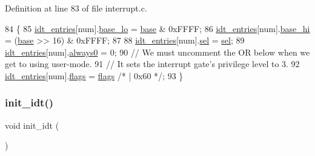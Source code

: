 Definition at line 83 of file interrupt.\+c.


\begin{DoxyCode}
84 \{
85     \hyperlink{a00110_a02c62ffc54da283f5faaa40b125d2dce_a02c62ffc54da283f5faaa40b125d2dce}{idt\_entries}[num].\hyperlink{a00240_a4b5fce0881deb4959d33da77d1ed0202_a4b5fce0881deb4959d33da77d1ed0202}{base\_lo} = \hyperlink{a00104_a0523cedff47e2441fc198b7770ec5d3f_a0523cedff47e2441fc198b7770ec5d3f}{base} & 0xFFFF;
86     \hyperlink{a00110_a02c62ffc54da283f5faaa40b125d2dce_a02c62ffc54da283f5faaa40b125d2dce}{idt\_entries}[num].\hyperlink{a00240_af46adb2603d1d8b4a3bedf7f1c6daed4_af46adb2603d1d8b4a3bedf7f1c6daed4}{base\_hi} = (\hyperlink{a00104_a0523cedff47e2441fc198b7770ec5d3f_a0523cedff47e2441fc198b7770ec5d3f}{base} >> 16) & 0xFFFF;
87 
88     \hyperlink{a00110_a02c62ffc54da283f5faaa40b125d2dce_a02c62ffc54da283f5faaa40b125d2dce}{idt\_entries}[num].\hyperlink{a00240_a3c9321c263139e56901a05efee220047_a3c9321c263139e56901a05efee220047}{sel}     = \hyperlink{a00110_af0b0a7e10694e3b600c7561311cc8271_af0b0a7e10694e3b600c7561311cc8271}{sel};
89     \hyperlink{a00110_a02c62ffc54da283f5faaa40b125d2dce_a02c62ffc54da283f5faaa40b125d2dce}{idt\_entries}[num].\hyperlink{a00240_adc747b3ff87142c71b7b8c51e03c067c_adc747b3ff87142c71b7b8c51e03c067c}{always0} = 0;
90     \textcolor{comment}{// We must uncomment the OR below when we get to using user-mode.}
91     \textcolor{comment}{// It sets the interrupt gate's privilege level to 3.}
92     \hyperlink{a00110_a02c62ffc54da283f5faaa40b125d2dce_a02c62ffc54da283f5faaa40b125d2dce}{idt\_entries}[num].\hyperlink{a00240_a02277c77564820972ae5df0a37c80be0_a02277c77564820972ae5df0a37c80be0}{flags}   = \hyperlink{a00110_aa2585d779da0ab21273a8d92de9a0ebe_aa2585d779da0ab21273a8d92de9a0ebe}{flags} \textcolor{comment}{/* | 0x60 */};
93 \}
\end{DoxyCode}
\mbox{\label{a00110_a35fe413107af682030ab7a4b6dff19b8_a35fe413107af682030ab7a4b6dff19b8}} 
\subsubsection{\texorpdfstring{init\+\_\+idt()}{init\_idt()}}
{\footnotesize\ttfamily void init\+\_\+idt (\begin{DoxyParamCaption}{ }\end{DoxyParamCaption})}



